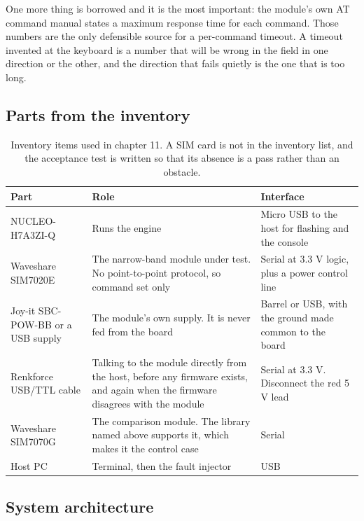 One more thing is borrowed and it is the most important: the module's own AT
command manual states a maximum response time for each command. Those numbers
are the only defensible source for a per-command timeout. A timeout invented at
the keyboard is a number that will be wrong in the field in one direction or the
other, and the direction that fails quietly is the one that is too long.

\subsection*{Parts from the inventory}

\begin{table}[H]\centering\small
\begin{tabular}{p{40mm}p{66mm}p{40mm}}
\toprule
Part & Role & Interface \\
\midrule
NUCLEO-H7A3ZI-Q & Runs the engine & Micro USB to the host for flashing and the console \\
Waveshare SIM7020E & The narrow-band module under test. No point-to-point protocol, so command set only & Serial at 3.3 V logic, plus a power control line \\
Joy-it SBC-POW-BB or a USB supply & The module's own supply. It is never fed from the board & Barrel or USB, with the ground made common to the board \\
Renkforce USB/TTL cable & Talking to the module directly from the host, before any firmware exists, and again when the firmware disagrees with the module & Serial at 3.3 V. Disconnect the red 5 V lead \\
Waveshare SIM7070G & The comparison module. The library named above supports it, which makes it the control case & Serial \\
Host PC & Terminal, then the fault injector & USB \\
\bottomrule
\end{tabular}
\caption{Inventory items used in chapter 11. A SIM card is not in the inventory list, and the acceptance test is written so that its absence is a pass rather than an obstacle.}
\end{table}

\subsection*{System architecture}


